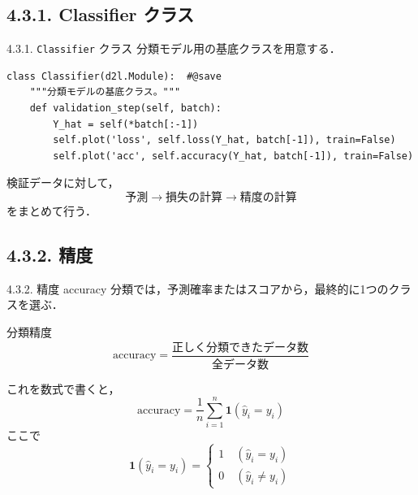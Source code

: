 \documentclass[dvipdfmx,uplatex,11pt]{beamer}
\begin{document}
\subsection{4.3.1. Classifier クラス}
\begin{frame}[fragile]{4.3.1. \texttt{Classifier} クラス}
分類モデル用の基底クラスを用意する．

\vspace{2mm}

\begin{lstlisting}
class Classifier(d2l.Module):  #@save
    """分類モデルの基底クラス。"""
    def validation_step(self, batch):
        Y_hat = self(*batch[:-1])
        self.plot('loss', self.loss(Y_hat, batch[-1]), train=False)
        self.plot('acc', self.accuracy(Y_hat, batch[-1]), train=False)
\end{lstlisting}
\begin{d2lplainbox}
検証データに対して，
\[
\text{予測}
\rightarrow
\text{損失の計算}
\rightarrow
\text{精度の計算}
\]
をまとめて行う．
\end{d2lplainbox}
\end{frame}

\subsection{4.3.2. 精度}
\begin{frame}{4.3.2. 精度 accuracy}
分類では，予測確率またはスコアから，最終的に1つのクラスを選ぶ．

\begin{center}
\end{center}
\begin{d2lbox}{分類精度}
\[
\mathrm{accuracy}
=
\frac{\text{正しく分類できたデータ数}}{\text{全データ数}}
\]
\end{d2lbox}
これを数式で書くと，
\[
\mathrm{accuracy}
=
\frac{1}{n}
\sum_{i=1}^{n}
\bm{1}(\hat y_i = y_i)
\]
ここで
\vspace{-0.5em}
{\small
\[
\bm{1}(\hat y_i = y_i)
=
\begin{cases}
1 \quad ( \hat y_i = y_i) \\
0  \quad ( \hat y_i \neq y_i)
\end{cases}
\]
}

\end{frame}
\end{document}
